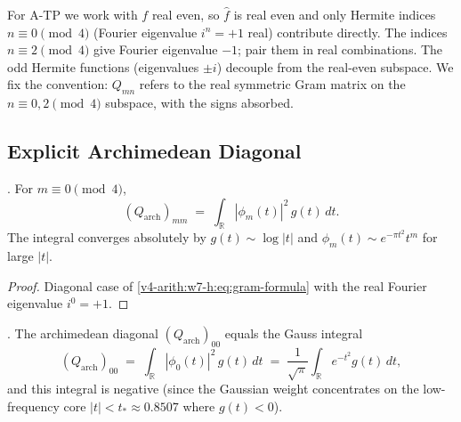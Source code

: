\begin{remark}
\label{v4-arith:w7-h:rem:reality}
For A-TP we work with \(f\) real even, so \(\widehat{f}\) is real even
and only Hermite indices \(n\equiv 0\pmod{4}\) (Fourier eigenvalue
\(i^{n}=+1\) real) contribute directly. The indices
\(n\equiv 2\pmod{4}\) give Fourier eigenvalue \(-1\); pair them in real
combinations. The odd Hermite functions (eigenvalues \(\pm i\))
decouple from the real-even subspace. We fix the convention: \(Q_{mn}\)
refers to the real symmetric Gram matrix on the \(n\equiv 0,2\pmod{4}\)
subspace, with the signs absorbed.
\end{remark}

\subsection{Explicit Archimedean Diagonal}
\label{v4-arith:w7-h:hermite-basis:arch-diagonal}

\begin{proposition}
\label{v4-arith:w7-h:prop:arch-diagonal}
\ClaimStatusProvedHere. For \(m\equiv 0\pmod{4}\),
\begin{equation}
\label{v4-arith:w7-h:eq:arch-diagonal}
(Q_{\mathrm{arch}})_{mm}\;=\;\int_{\mathbb{R}}|\phi_{m}(t)|^{2}\,g(t)\,dt.
\end{equation}
The integral converges absolutely by \(g(t)\sim\log|t|\) and
\(\phi_{m}(t)\sim e^{-\pi t^{2}}t^{m}\) for large \(|t|\).
\end{proposition}

\begin{proof}
Diagonal case of \eqref{v4-arith:w7-h:eq:gram-formula} with the
real Fourier eigenvalue \(i^{0}=+1\).
\end{proof}

\begin{lemma}
\label{v4-arith:w7-h:lem:arch-diagonal-sign}
\ClaimStatusProvedHere. The archimedean diagonal
\((Q_{\mathrm{arch}})_{00}\) equals the Gauss integral
\begin{equation}
\label{v4-arith:w7-h:eq:arch-00}
(Q_{\mathrm{arch}})_{00}
\;=\;\int_{\mathbb{R}}|\phi_{0}(t)|^{2}\,g(t)\,dt
\;=\;\frac{1}{\sqrt{\pi}}\int_{\mathbb{R}}e^{-t^{2}}g(t)\,dt,
\end{equation}
and this integral is negative (since the Gaussian weight concentrates
on the low-frequency core \(|t|<t_{\ast}\approx 0.8507\) where
\(g(t)<0\)).
\end{lemma}


